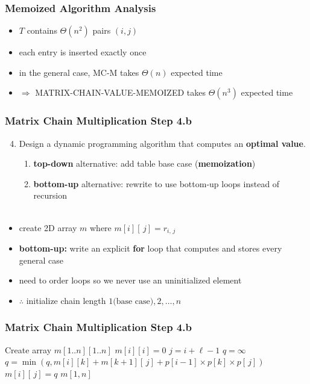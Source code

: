 \documentclass{beamer}
\newcommand{\stanza}{ \\~\ }
\begin{document}
\begin{frame} \frametitle{Memoized Algorithm Analysis}
  \begin{itemize}
    \item $T$ contains $\Theta(n^2)$ pairs $(i, j)$
    \item each entry is inserted exactly once
    \item in the general case, MC-M takes $\Theta(n)$ expected time
    \item $\Rightarrow$ MATRIX-CHAIN-VALUE-MEMOIZED takes $\Theta(n^3)$ expected time
  \end{itemize}
\end{frame}

\begin{frame} \frametitle{Matrix Chain Multiplication Step 4.b}
  \begin{enumerate}
    \setcounter{enumi}{3}
    \item Design a dynamic programming algorithm that computes an \textbf{optimal value}.
    \begin{enumerate}
      \item \textbf{top-down} alternative: add table base case (\textbf{memoization})
      \item \textbf{bottom-up} alternative: rewrite to use bottom-up loops instead of recursion
      \stanza
    \end{enumerate}
\end{enumerate}

\begin{itemize}
  \item create 2D array $m$ where $m[i][\, j] = r_{i, \, j}$
  \item \textbf{bottom-up:} write an explicit \textbf{for} loop that computes and stores every general case
  \item need to order loops so we never use an uninitialized element
  \item $\therefore$ initialize chain length $1 \text{(base case)}, 2, \ldots, n$
\end{itemize}
\end{frame}

\begin{frame} \frametitle{Matrix Chain Multiplication Step 4.b}
  {\footnotesize
  \begin{algorithmic}[1]
    \State Create array $m[1..n][1..n]$
      \State $m[i][i] = 0$ 
    \EndFor
     
        \State $j = i + \ell - 1$
        \State $q=\infty$
          \State $q = \min(q, m[i][k] + m[k+1][\,j] + p[i-1] \times p[k] \times p[\,j])$
        \EndFor
        \State $m[i][\,j] = q$
      \EndFor
    \EndFor
    \State \Return $m[1, n]$
    \EndFunction
  \end{algorithmic}
  }
\end{frame}
\end{document}
